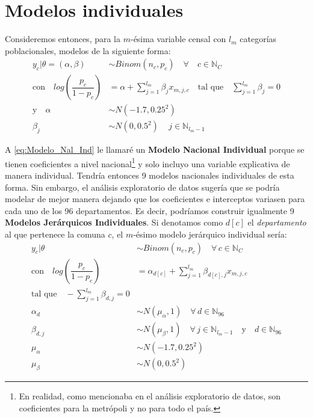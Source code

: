 \section{Modelos individuales}

Consideremos entonces, para la $m$-ésima variable censal con $l_m$ categorías poblacionales, modelos de la siguiente forma:
\begin{align}\label{eq:Modelo_Nal_Ind}
y_c|\theta=(\alpha,\beta) & \sim Binom(n_c,p_c) \quad \forall \quad c \in \mathbb{N}_C \nonumber \\
\text{con} \quad log\left(\dfrac{p_c}{1-p_c}\right) &= \alpha + \sum\limits_{j=1}^{l_m} \beta_j x_{m,j,c} \quad \text{tal que} \quad \sum\limits_{j = 1}^{l_m} \beta_j = 0 \nonumber \\
\text{y} \quad \alpha & \sim N(-1.7,0.25^2) \nonumber \\
\beta_j & \sim N(0,0.5^2) \quad \, j \in \mathbb{N}_{l_m-1} 
\end{align}

A \eqref{eq:Modelo_Nal_Ind} le llamaré un \textbf{Modelo Nacional Individual} porque se tienen coeficientes a nivel nacional\footnote{En realidad, como mencionaba en el análisis exploratorio de datos, son coeficientes para la metrópoli y no para todo el país.} y solo incluyo una variable explicativa de manera individual. Tendría entonces 9 modelos nacionales individuales de esta forma. Sin embargo, el análisis exploratorio de datos sugería que se podría modelar de mejor manera dejando que los coeficientes e interceptos variasen para cada uno de los 96 departamentos. Es decir, podríamos construir igualmente 9 \textbf{Modelos Jerárquicos Individuales}. Si denotamos como $d[c]$ el \textit{departamento} al que pertenece la comuna $c$, el $m$-ésimo modelo jerárquico individual sería: 
\begin{align}\label{eq:Modelo_Jer_Ind}
y_c|\theta & \sim Binom(n_c,p_c) \quad \forall \, c \in \mathbb{N}_C \nonumber \\
\text{con} \quad log\left(\dfrac{p_c}{1-p_c}\right) &= \alpha_{d[c]} + \sum\limits_{j=1}^{l_m} \beta_{d[c],j} x_{m,j,c} \nonumber\\ 
\text{tal que} \quad -\sum\limits_{j = 1}^{l_m} \beta_{d,j} = 0 \nonumber \\
\alpha_d & \sim N(\mu_{\alpha}, 1) \quad \forall \, d \in \mathbb{N}_{96} \nonumber \\
\beta_{d,j} & \sim N(\mu_{\beta}, 1) \quad \forall \, j \in \mathbb{N}_{l_m-1}  \quad \text{y} \quad d \in \mathbb{N}_{96} \nonumber \\
\mu_{\alpha} &\sim N(-1.7, 0.25^2) \nonumber \\
\mu_{\beta} &\sim N(0,0.5^2)
\end{align}

